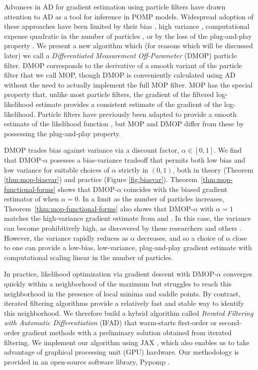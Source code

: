 \documentclass[11pt]{article}
\begin{document}
Advances in AD for gradient estimation using particle filters \citep{naesseth18, jonschkowski18, corenflos21, scibior21, singh22} have drawn attention to AD as a tool for inference in POMP models.
Widespread adoption of these approaches have been limited by their bias \citep{naesseth18, jonschkowski18}, high variance \citep{poyiadjis11, scibior21}, computational expense quadratic in the number of particles \citep{corenflos21, chen24}, or by the loss of the plug-and-play property \citep{poyiadjis11, scibior21, singh22, chen24}.
We present a new algorithm which (for reasons which will be discussed later) we call a {\it Differentiated Measurement Off-Parameter} (DMOP) particle filter.
DMOP corresponds to the derivative of a smooth variant of the particle filter that we call MOP, though DMOP is conveniently calculated using AD without the need to actually implement the full MOP filter.
MOP has the special property that, unlike most particle filters, the gradient of the filtered log-likelihood estimate provides a consistent estimate of the gradient of the log-likelihood.
Particle filters have previously been adapted to provide a smooth estimate of the likelihood function \citep{svensson18,malik11}, but MOP and DMOP differ from these by possessing the plug-and-play property.

DMOP trades bias against variance via a discount factor, $\alpha \in [0,1]$.
We find that DMOP-$\alpha$ posesses a bias-variance tradeoff that permits both low bias and low variance for suitable choices of $\alpha$ strictly in $(0,1)$, both in theory (Theorem \ref{thm:mop-biasvar}) and practice (Figure \ref{fig:biasvar}).
Theorem~\ref{thm:mop-functional-forms} shows that DMOP-$\alpha$ coincides with the biased gradient estimator of \cite{naesseth18} when $\alpha=0$.
In a limit as the number of particles increases, Theorem~\ref{thm:mop-functional-forms} also shows that DMOP-$\alpha$ with $\alpha=1$ matches the high-variance gradient estimate from \cite{poyiadjis11} and \cite{scibior21}.
In this case, the variance can become prohibitively high, as discovered by these researchers and others \citep{arya22}.
However, the variance rapidly reduces as $\alpha$ decreases, and so a choice of $\alpha$ close to one can provide a low-bias, low-variance, plug-and-play gradient estimate with computational scaling linear in the number of particles.

In practice, likelihood optimization via gradient descent with DMOP-$\alpha$ converges quickly within a neighborhood of the maximum but struggles to reach this neighborhood in the presence of local minima and saddle points.
By contrast, iterated filtering algorithms provide a relatively fast and stable way to identify this neighborhood.
We therefore build a hybrid algorithm called {\it Iterated Filtering with Automatic Differentiation} (IFAD) that warm-starts first-order or second-order gradient methods with a preliminary solution obtained from iterated filtering.
We implement our algorithm using JAX \citep{jax}, which also enables us to take advantage of graphical processing unit (GPU) hardware.
Our methodology is provided in an open-source software library, Pypomp \citep{abkemeier25}.
\end{document}
